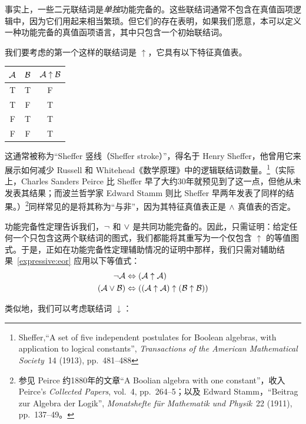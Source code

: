 事实上，一些二元联结词是\emph{单独}功能完备的。这些联结词通常不包含在真值函项逻辑中，因为它们用起来相当繁琐。但它们的存在表明，如果我们愿意，本可以定义一种功能完备的真值函项语言，其中只包含一个初始联结词。

我们要考虑的第一个这样的联结词是 $\uparrow$，它具有以下特征真值表。

\begin{center}
\begin{tabular}{c c | c}
$\mathcal{A}$ & $\mathcal{B}$ & $\mathcal{A} \mathrel{\uparrow} \mathcal{B}$\\
\hline
 T & T & F \\
 T & F & T \\
 F & T & T  \\
 F & F & T
\end{tabular}
\end{center}

这通常被称为“Sheffer 竖线（Sheffer stroke）”，得名于 Henry Sheffer，他曾用它来展示如何减少 Russell 和 Whitehead《数学原理》中的逻辑联结词数量。\footnote{Sheffer,“A set of five independent postulates for Boolean algebras, with application to logical constants”, \textit{Transactions of the American Mathematical Society}~14 (1913), pp.~481--488}（实际上，Charles Sanders Peirce 比 Sheffer 早了大约30年就预见到了这一点，但他从未发表其结果；而波兰哲学家 Edward Stamm 则比 Sheffer 早两年发表了同样的结果。）\footnote{参见 Peirce 约1880年的文章“A Boolian algebra with one constant”，收入 Peirce's \textit{Collected Papers}, vol.~4, pp.~264--5；以及 Edward Stamm，“\foreignlanguage{german}{Beitrag zur Algebra der Logik}”, \foreignlanguage{german}{\textit{Monatshefte für Mathematik und Physik}}~22 (1911), pp.~137--49。}同样常见的是将其称为“与非”，因为其特征真值表正是 $\wedge$ 真值表的否定。

功能完备性定理告诉我们，$\neg$ 和 $\vee$ 是共同功能完备的。因此，只需证明：给定任何一个只包含这两个联结词的图式，我们都能将其重写为一个仅包含 $\uparrow$ 的等值图式。于是，正如在功能完备性定理辅助情况的证明中那样，我们只需对辅助结果~\ref*{expressive:eor} 应用以下等值式：
		\begin{align*}
			\neg \mathcal{A} &\Leftrightarrow (\mathcal{A} \uparrow \mathcal{A})\\
			(\mathcal{A} \vee \mathcal{B}) & \Leftrightarrow ((\mathcal{A} \uparrow \mathcal{A}) \uparrow (\mathcal{B} \uparrow \mathcal{B}))
		\end{align*}

类似地，我们可以考虑联结词 $\downarrow$：

